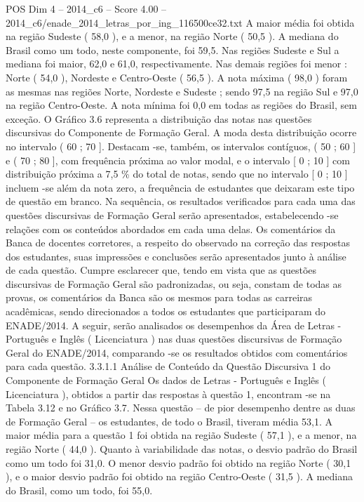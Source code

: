 \begin{textsample}{POS Dim 4 – 2014\_c6 – Score 4.00 – 2014\_c6/enade\_2014\_letras\_por\_ing\_116500ce32.txt}
A maior média foi obtida na região Sudeste ( 58,0 ), e a menor, na região Norte ( 50,5 ).
A mediana do Brasil como um todo, neste componente, foi 59,5.
Nas regiões Sudeste e Sul a mediana foi maior, 62,0 e 61,0, respectivamente.
Nas demais regiões foi menor : Norte ( 54,0 ), Nordeste e Centro-Oeste ( 56,5 ).
A nota máxima ( 98,0 ) foram as mesmas nas regiões Norte, Nordeste e Sudeste ; sendo 97,5 na região Sul e 97,0 na região Centro-Oeste.
A nota mínima foi 0,0 em todas as regiões do Brasil, sem exceção.
O Gráfico 3.6 representa a distribuição das notas nas questões discursivas do Componente de Formação Geral.
A moda desta distribuição ocorre no intervalo ( 60 ; 70 ].
Destacam -se, também, os intervalos contíguos, ( 50 ; 60 ] e ( 70 ; 80 ], com frequência próxima ao valor modal, e o intervalo [ 0 ; 10 ] com distribuição próxima a 7,5 \% do total de notas, sendo que no intervalo [ 0 ; 10 ] incluem -se além da nota zero, a frequência de estudantes que deixaram este tipo de questão em branco.
Na sequência, os resultados verificados para cada uma das questões discursivas de Formação Geral serão apresentados, estabelecendo -se relações com os conteúdos abordados em cada uma delas.
Os comentários da Banca de docentes corretores, a respeito do observado na correção das respostas dos estudantes, suas impressões e conclusões serão apresentados junto à análise de cada questão.
Cumpre esclarecer que, tendo em vista que as questões discursivas de Formação Geral são padronizadas, ou seja, constam de todas as provas, os comentários da Banca são os mesmos para todas as carreiras acadêmicas, sendo direcionados a todos os estudantes que participaram do ENADE/2014.
A seguir, serão analisados os desempenhos da Área de Letras - Português e Inglês ( Licenciatura ) nas duas questões discursivas de Formação Geral do ENADE/2014, comparando -se os resultados obtidos com comentários para cada questão. 3.3.1.1 Análise de Conteúdo da Questão Discursiva 1 do Componente de Formação Geral Os dados de Letras - Português e Inglês ( Licenciatura ), obtidos a partir das respostas à questão 1, encontram -se na Tabela 3.12 e no Gráfico 3.7.
Nessa questão – de pior desempenho dentre as duas de Formação Geral – os estudantes, de todo o Brasil, tiveram média 53,1.
A maior média para a questão 1 foi obtida na região Sudeste ( 57,1 ), e a menor, na região Norte ( 44,0 ).
Quanto à variabilidade das notas, o desvio padrão do Brasil como um todo foi 31,0.
O menor desvio padrão foi obtido na região Norte ( 30,1 ), e o maior desvio padrão foi obtido na região Centro-Oeste ( 31,5 ).
A mediana do Brasil, como um todo, foi 55,0.

\end{textsample}
